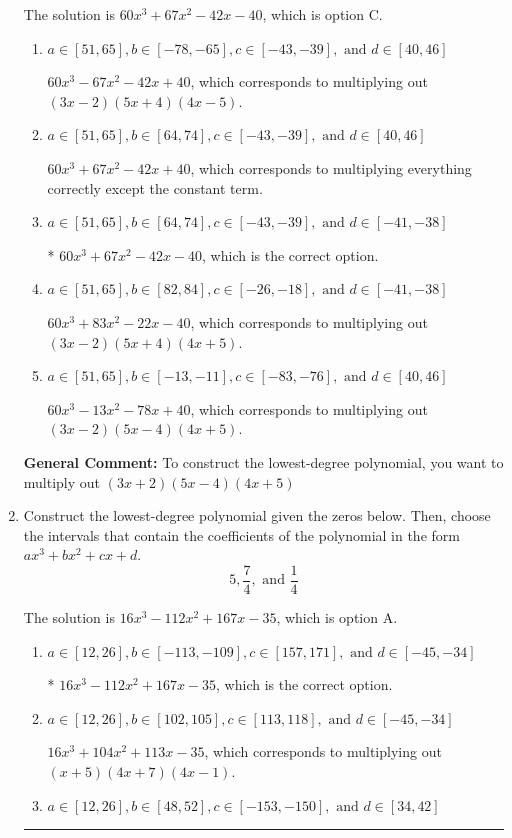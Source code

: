 \documentclass{extbook}[14pt]
\newcommand{\litem}[1]{\item #1

\rule{\textwidth}{0.4pt}}
\begin{document}
\begin{enumerate}
{The solution is \( 60x^{3} +67 x^{2} -42 x -40 \), which is option C.\begin{enumerate}[label=\Alph*.]
\item \( a \in [51, 65], b \in [-78, -65], c \in [-43, -39], \text{ and } d \in [40, 46] \)

$60x^{3} -67 x^{2} -42 x + 40$, which corresponds to multiplying out $(3x -2)(5x + 4)(4x -5)$.
\item \( a \in [51, 65], b \in [64, 74], c \in [-43, -39], \text{ and } d \in [40, 46] \)

$60x^{3} +67 x^{2} -42 x + 40$, which corresponds to multiplying everything correctly except the constant term.
\item \( a \in [51, 65], b \in [64, 74], c \in [-43, -39], \text{ and } d \in [-41, -38] \)

* $60x^{3} +67 x^{2} -42 x -40$, which is the correct option.
\item \( a \in [51, 65], b \in [82, 84], c \in [-26, -18], \text{ and } d \in [-41, -38] \)

$60x^{3} +83 x^{2} -22 x -40$, which corresponds to multiplying out $(3x -2)(5x + 4)(4x + 5)$.
\item \( a \in [51, 65], b \in [-13, -11], c \in [-83, -76], \text{ and } d \in [40, 46] \)

$60x^{3} -13 x^{2} -78 x + 40$, which corresponds to multiplying out $(3x -2)(5x -4)(4x + 5)$.
\end{enumerate}

\textbf{General Comment:} To construct the lowest-degree polynomial, you want to multiply out $(3x + 2)(5x -4)(4x + 5)$
}
\litem{
Construct the lowest-degree polynomial given the zeros below. Then, choose the intervals that contain the coefficients of the polynomial in the form $ax^3+bx^2+cx+d$.
\[ 5, \frac{7}{4}, \text{ and } \frac{1}{4} \]

The solution is \( 16x^{3} -112 x^{2} +167 x -35 \), which is option A.\begin{enumerate}[label=\Alph*.]
\item \( a \in [12, 26], b \in [-113, -109], c \in [157, 171], \text{ and } d \in [-45, -34] \)

* $16x^{3} -112 x^{2} +167 x -35$, which is the correct option.
\item \( a \in [12, 26], b \in [102, 105], c \in [113, 118], \text{ and } d \in [-45, -34] \)

$16x^{3} +104 x^{2} +113 x -35$, which corresponds to multiplying out $(x + 5)(4x + 7)(4x -1)$.
\item \( a \in [12, 26], b \in [48, 52], c \in [-153, -150], \text{ and } d \in [34, 42] \)


\end{enumerate}}
\end{enumerate}
\end{document}
